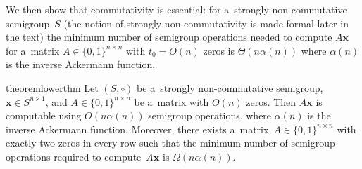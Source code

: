 \documentclass[11pt,letterpaper]{article}
\begin{document}
We then show that commutativity is essential: for 
a~strongly non-commutative semigroup~$S$ 
(the notion of strongly non-commutativity is made formal
later in the text) the minimum number of semigroup operations
needed to compute $A\mathbf{x}$ for a~matrix 
$A \in \{0,1\}^{n \times n}$ with $t_0=O(n)$ zeros is $\Theta(n\alpha(n))$ where $\alpha(n)$ is the inverse Ackermann function.

\begin{restatable}{theorem}{lowerthm}
\label{thm:lowerbound}
Let $(S, \circ)$ be a~strongly non-commutative semigroup, $\mathbf{x} \in S^{n \times 1}$, and $A \in \{0,1\}^{n \times n}$
be a~matrix with $O(n)$ zeros. Then $A\mathbf{x}$ is computable
using $O(n\alpha(n))$ semigroup operations, where $\alpha(n)$
is the inverse Ackermann function. Moreover, there exists
a~matrix~$A \in \{0,1\}^{n \times n}$ with exactly two zeros
in every row such that the minimum number of semigroup operations
required to compute~$A\mathbf{x}$ is $\Omega(n\alpha(n))$.
\end{restatable}
\end{document}
